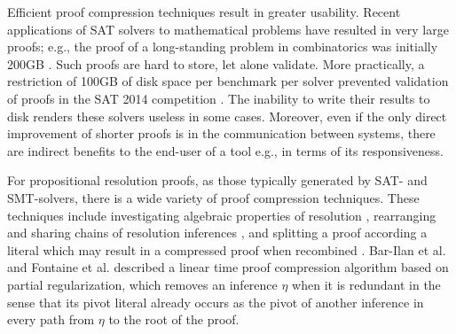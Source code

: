 Efficient proof compression techniques result in greater usability. 
Recent applications of SAT solvers to mathematical problems have resulted in very large proofs; e.g., the proof of a long-standing problem in combinatorics was initially 200GB \cite{heule2016solving}. Such proofs are hard to store, let alone validate. More practically, a restriction of 100GB of disk space per benchmark per solver prevented validation of proofs in the SAT 2014 competition \cite{clausal}. 
The inability to write their results to disk renders these solvers useless in some cases. Moreover, even if the only direct improvement of shorter proofs is in the communication between systems, there are indirect benefits to the end-user of a tool e.g., in terms of its responsiveness. %



For propositional resolution proofs, as those typically generated by SAT- and SMT-solvers, there is a wide variety of proof compression techniques. 
These techniques include investigating algebraic properties of resolution \cite{bwp10}, rearranging and sharing chains of resolution inferences \cite{Amjad07, Sinz}, and splitting a proof according a literal which may result in a compressed proof when recombined \cite{CottonSplit}.
Bar-Ilan et al. \cite{RP08} and Fontaine et al. \cite{LURPI} described a linear time proof compression algorithm based on partial
regularization, which removes an inference $\eta$ when it is redundant in the sense that its pivot literal already occurs as the pivot of another inference in every path from $\eta$ to the root of the proof.


